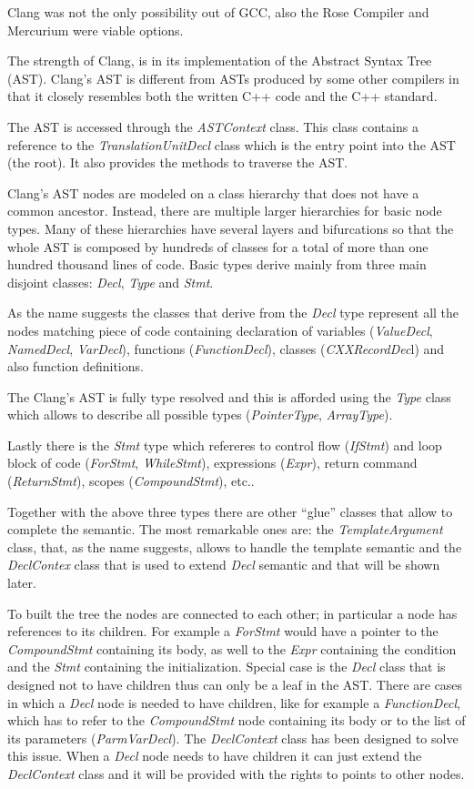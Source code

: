 \documentclass[a4paper,11pt,oneside]{book}
\begin{document}
Clang was not the only possibility out of GCC, also the Rose Compiler and Mercurium were viable options. 

The strength of Clang, is in its implementation of the Abstract Syntax Tree (AST). Clang’s AST is different from ASTs produced by some other compilers in that it closely resembles both the written C++ code and the C++ standard.

The AST is accessed through the \emph{ASTContext} class. This class contains a reference to the \emph{TranslationUnitDecl} class which is the entry point into the AST (the root). It also provides the methods to traverse the AST.

Clang’s AST nodes are modeled on a class hierarchy that does not have a common ancestor. Instead, there are multiple larger hierarchies for basic node types. Many of these hierarchies have several layers and bifurcations so that the whole AST is composed by hundreds of classes for a total of more than one hundred thousand lines of code. Basic types derive mainly from three main disjoint classes: \emph{Decl}, \emph{Type} and \emph{Stmt}. 

As the name suggests the classes that derive from the \emph{Decl} type represent all the nodes matching piece of code containing declaration of variables (\emph{ValueDecl}, \emph{NamedDecl}, \emph{VarDecl}), functions (\emph{FunctionDecl}), classes (\emph{CXXRecordDec}l) and also function definitions.
  
The Clang’s AST is fully type resolved and this is afforded using the \emph{Type} class which allows to describe all possible types (\emph{PointerType}, \emph{ArrayType}).

Lastly there is the \emph{Stmt} type which refereres to control flow (\emph{IfStmt}) and loop block of code (\emph{ForStmt}, \emph{WhileStmt}), expressions (\emph{Expr}), return command (\emph{ReturnStmt}), scopes (\emph{CompoundStmt}), etc.. 

Together with the above three types there are other “glue” classes that allow to complete the semantic. The most remarkable ones are: the \emph{TemplateArgument} class, that, as the name suggests, allows to handle the template semantic and the \emph{DeclContex} class that is used to extend \emph{Decl} semantic and that will be shown later. 

To built the tree the nodes are connected to each other; in particular a node has references to its children. For example a \emph{ForStmt} would have a pointer to the \emph{CompoundStmt} containing its body, as well to the \emph{Expr} containing the condition and the \emph{Stmt} containing the initialization. Special case is the \emph{Decl} class that is designed not to have children thus can only be a leaf in the AST. There are cases in which a \emph{Decl} node is needed to have children, like for example a \emph{FunctionDecl}, which has to refer to the \emph{CompoundStmt} node containing its body or to the list of its parameters (\emph{ParmVarDecl}). The \emph{DeclContext} class has been designed to solve this issue. When a \emph{Decl} node needs to have children it can just extend the \emph{DeclContext} class and it will be provided with the rights to points to other nodes. 
\end{document}
